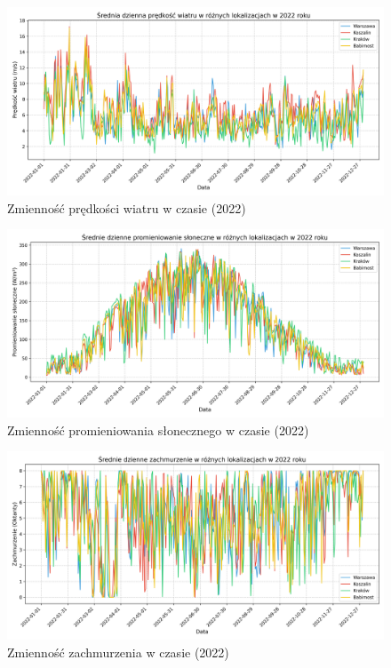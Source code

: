 \begin{figure}
    \centering
    \includegraphics[width=\textwidth]{../plots/data/wind_speed_time_series_2022.png}
    \caption{Zmienność prędkości wiatru w czasie (2022)}
    \label{fig:wind-speed-time-series-2022}
\end{figure}

\begin{figure}
    \centering
    \includegraphics[width=\textwidth]{../plots/data/solar_radiation_time_series_2022.png}
    \caption{Zmienność promieniowania słonecznego w czasie (2022)}
    \label{fig:solar-radiation-time-series-2022}
\end{figure}

\begin{figure}
    \centering
    \includegraphics[width=\textwidth]{../plots/data/cloud_cover_time_series_2022.png}
    \caption{Zmienność zachmurzenia w czasie (2022)}
    \label{fig:cloud-cover-time-series-2022}
\end{figure}

